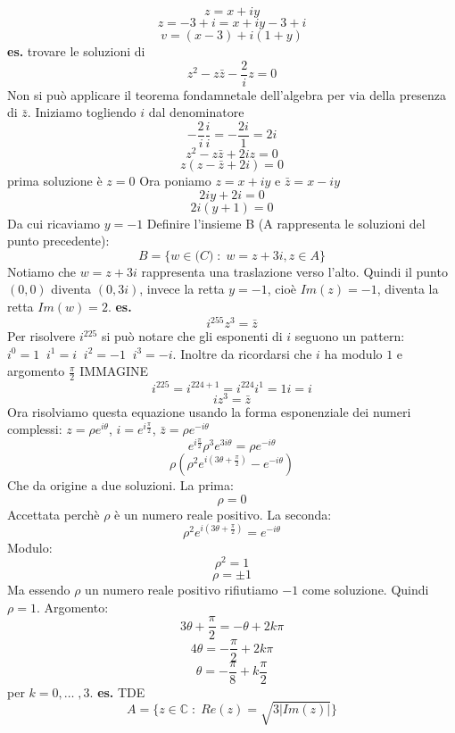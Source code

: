 \[
    z = x+iy
\] 
\[
    z = -3+i = x +iy-3+i
\] 
\[
    v = (x-3) +i (1+y)
\] 
\newline
\textbf{es.} trovare le soluzioni di
\[
    z^2-z\bar{z}-\frac{2}{i}z = 0
\] 
Non si può applicare il teorema fondamnetale dell'algebra per via della presenza di $\bar{z}$.
\newline
Iniziamo togliendo $i$ dal denominatore
\[
    -\frac{2}{i}\frac{i}{i} = -\frac{2i}{1} = 2i
\] 
\[
    z^2 -z \bar{z} + 2iz = 0
\] 
\[
    z(z-\bar{z} + 2i) = 0
\] 
prima soluzione è $z=0$
\newline
Ora poniamo $z= x+iy$ e $\bar{z}=x-iy$
\[
    2iy +2i = 0
\] 
\[
    2i(y+1) = 0
\] 
Da cui ricaviamo $y = -1$
\newline
Definire l'insieme B (A rappresenta le soluzioni del punto precedente):
\[
    B = \{w \in \mathbb(C) \;:\; w = z+3i, z \in A \}
\] 
Notiamo che $w = z+3i$ rappresenta una traslazione verso l'alto. Quindi il punto $(0,0)$ diventa $(0,3i)$, invece la retta $y = -1$, cioè $Im(z) = -1$, diventa la retta $Im(w) = 2$.
\newline
\newline
\textbf{es.} 
\[
    i ^ {255} z^3 = \bar{z}
\] 
Per risolvere $i^{225}$ si può notare che gli esponenti di $i$ seguono un pattern: $i^0 = 1 \;\; i^1 = i \;\; i^2 = -1 \;\; i^3 = -i$. Inoltre da ricordarsi che $i$ ha modulo $1$ e argomento $\frac{\pi}{2}$
\newline
IMMAGINE
\newline
\[
    i^{225} = i^{224+1} = i^{224} i^{1} = 1i = i
\] 
\[
    iz^3 = \bar{z}    
\] 
Ora risolviamo questa equazione usando la forma esponenziale dei numeri complessi: $z=\rho e ^ {i\theta}$, $i=e^{i\frac{\pi}{2}}$, $\bar{z} = \rho e^{-i\theta}$
\[
    e ^{i\frac{\pi}{2}}\rho^3 e^{3i\theta} = \rho e^{-i\theta}
\] 
\[
    \rho (\rho ^2 e^{i(3\theta + \frac{\pi}{2})} - e ^{-i\theta})
\] 
Che da origine a due soluzioni. La prima:
\[
    \rho = 0
\] 
Accettata perchè $\rho$ è un numero reale positivo. La seconda:
\[
    \rho ^ 2 e ^{i(3\theta + \frac{\pi}{2})}= e^{-i\theta}
\] 
Modulo:
\[
    \rho ^ 2 = 1
\] 
\[
    \rho = \pm 1
\] 
Ma essendo $\rho$ un numero reale positivo rifiutiamo $-1$ come soluzione. Quindi $\rho = 1$.
\newline
Argomento:
\[
    3 \theta + \frac{\pi}{2} = -\theta + 2k\pi
\] 
\[
    4\theta = -\frac{\pi}{2} + 2k\pi
\] 
\[
    \theta = -\frac{\pi}{8} +k\frac{\pi}{2}    
\] 
per $k = 0,\dots \;,3$.
\newline
\textbf{es.} TDE
\[
    A =\{z \in \mathbb{C} \;:\; Re(z) = \sqrt{3|Im(z)|}\}
\] 
